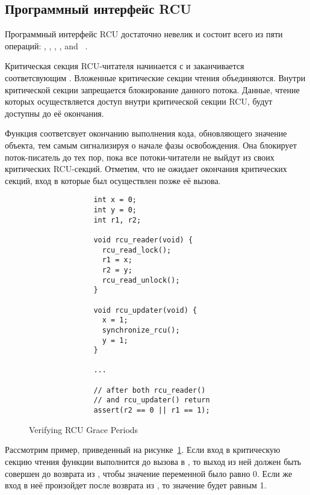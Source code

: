 \subsection{Программный интерфейс RCU} \label{sec:api_usage}
Программный интерфейс RCU достаточно невелик и состоит всего из пяти операций:
, , ,
, and ~\cite{McKenneyOSR08}.

Критическая секция RCU-читателя начинается с 
и заканчивается соответсвующим .
Вложенные критические секции чтения объединяются.
Внутри критической секции запрещается блокирование данного потока.
Данные, чтение которых осуществляется доступ внутри критической секции RCU,
будут доступны до её окончания.

Функция  соответсвует окончанию выполнения кода,
обновляющего значение объекта, тем самым сигнализируя о начале фазы освобождения.
Она блокирует поток-писатель до тех пор, пока все потоки-читатели
не выйдут из своих критических RCU-секций.
Отметим, что  не ожидает окончания
критических секций, вход в которые был осуществлен позже её вызова.


\begin{figure}[tbp]
\centering
\footnotesize
\begin{verbatim}
               int x = 0;
               int y = 0;
               int r1, r2;

               void rcu_reader(void) {
                 rcu_read_lock();
                 r1 = x;
                 r2 = y;
                 rcu_read_unlock();
               }

               void rcu_updater(void) {
                 x = 1;
                 synchronize_rcu();
                 y = 1;
               }

               ...

               // after both rcu_reader()
               // and rcu_updater() return
               assert(r2 == 0 || r1 == 1);
\end{verbatim}
\caption{Verifying RCU Grace Periods}
\label{fig:verify_rcu_gp}
\end{figure}

Рассмотрим пример, приведенный на рисунке~\ref{fig:verify_rcu_gp}.
Если вход в критическую секцию чтения функции  выполнится до
вызова  в , то выход из ней должен быть
совершен до возврата из , чтобы значение переменной
 было равно 0. Если же вход в неё произойдет после возврата из
, то значение  будет равным 1.

